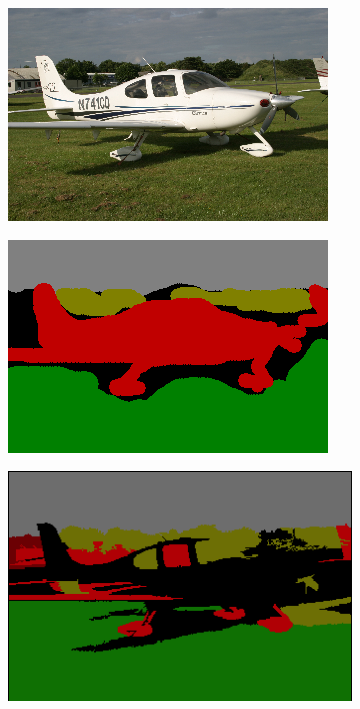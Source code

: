 \documentclass{article} %
\begin{document}
\begin{figure}[htb]
	\begin{subfigure}[t]{0.19\textwidth}
		\centering
		\includegraphics[width = \textwidth]{./img/4_14_s.png}
		\caption{}
		\label{fig:orig_plane}
	\end{subfigure}
	\begin{subfigure}[t]{0.19\textwidth}
		\centering
		\includegraphics[width = \textwidth]{./img/4_14_s_GT.png}
		\caption{}
		\label{fig:GT_plane}
	\end{subfigure}
	\begin{subfigure}[t]{0.19\textwidth}
		\centering
		\includegraphics[width = \textwidth]{./img/4_14_s_prior.png}

\end{subfigure}
\end{figure}
\end{document}
